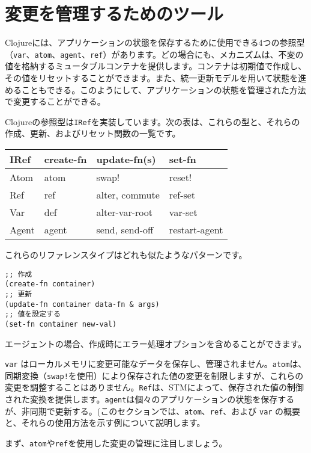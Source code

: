 \section{変更を管理するためのツール}

Clojureには、アプリケーションの状態を保存するために使用できる4つの参照型（\texttt{var}、\texttt{atom}、\texttt{agent}、\texttt{ref}）があります。どの場合にも、メカニズムは、不変の値を格納するミュータブルコンテナを提供します。コンテナは初期値で作成し、その値をリセットすることができます。また、統一更新モデルを用いて状態を進めることもできる。このようにして、アプリケーションの状態を管理された方法で変更することができる。

Clojureの参照型は\texttt{IRef}を実装しています。次の表は、これらの型と、それらの作成、更新、およびリセット関数の一覧です。

\begin{tabular}{|l|l|l|l|}
\hline
IRef & create-fn & update-fn(s) & set-fn \\ \hline \hline
Atom & atom & swap! & reset! \\ \hline
Ref & ref & alter, commute & ref-set \\ \hline
Var & def & alter-var-root & var-set \\ \hline
Agent & agent & send, send-off & restart-agent \\ \hline
\end{tabular}

これらのリファレンスタイプはどれも似たようなパターンです。


\begin{lstlisting}[numbers=none]
;; 作成
(create-fn container)
;; 更新
(update-fn container data-fn & args)
;; 値を設定する
(set-fn container new-val)
\end{lstlisting}

エージェントの場合、作成時にエラー処理オプションを含めることができます。

\texttt{var} はローカルメモリに変更可能なデータを保存し、管理されません。\texttt{atom}は、同期変換（\texttt{swap!}を使用）により保存された値の変更を制限しますが、これらの変更を調整することはありません。\texttt{Ref}は、STMによって、保存された値の制御された変換を提供します。\texttt{agent}は個々のアプリケーションの状態を保存するが、非同期で更新する。(このセクションでは、\texttt{atom}、\texttt{ref}、および \texttt{var} の概要と、それらの使用方法を示す例について説明します。

まず、\texttt{atom}や\texttt{ref}を使用した変更の管理に注目しましょう。



